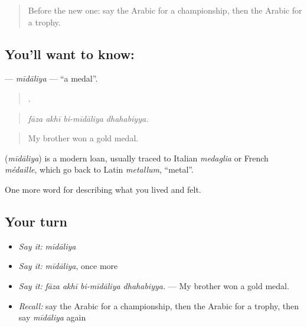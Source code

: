\label{lesson:AR-C547-midaliya}



\begin{quote}
Before the new one: say the Arabic for a championship, then the Arabic for a trophy.
\end{quote}

\subsection*{You'll want to know: }
\textbf{} — \emph{mīdāliya} — \textquotedblleft{}a medal\textquotedblright{}.

\begin{quote}
   .
\end{quote}

\begin{quote}
\emph{fāza akhī bi-mīdāliya dhahabiyya.}
\end{quote}

\begin{quote}
My brother won a gold medal.
\end{quote}

\begin{cousinweb}
\textbf{} (\emph{mīdāliya}) is a modern loan, usually traced to Italian \emph{medaglia} or French \emph{médaille}, which go back to Latin \emph{metallum}, \textquotedblleft{}metal\textquotedblright{}.
\end{cousinweb}

\begin{grammarlens}[title={What you've built}]
One more word for describing what you lived and felt.
\end{grammarlens}

\subsection*{Your turn}
\begin{itemize}
\raggedright
  \item \emph{Say it:} \emph{mīdāliya}
  \item \emph{Say it:} \emph{mīdāliya}, once more
  \item \emph{Say it:} \emph{fāza akhī bi-mīdāliya dhahabiyya.} — My brother won a gold medal.
  \item \emph{Recall:} say the Arabic for a championship, then the Arabic for a trophy, then say \emph{mīdāliya} again
\end{itemize}

